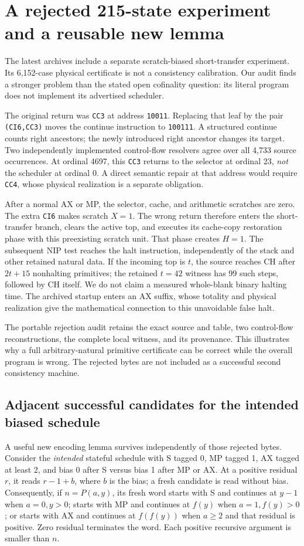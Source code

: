 \section{A rejected 215-state experiment and a reusable new lemma}
The latest archives include a separate scratch-biased short-transfer experiment. Its 6,152-case physical certificate is not a consistency calibration. Our audit finds a stronger problem than the stated open cofinality question: its literal program does not implement its advertised scheduler.

The original return was \texttt{CC3} at address \texttt{10011}. Replacing that leaf by the pair \texttt{(CI6,CC3)} moves the continue instruction to \texttt{100111}. A structured continue counts right ancestors; the newly introduced right ancestor changes its target. Two independently implemented control-flow resolvers agree over all 4,733 source occurrences. At ordinal 4697, this \texttt{CC3} returns to the selector at ordinal 23, \emph{not} the scheduler at ordinal 0. A direct semantic repair at that address would require \texttt{CC4}, whose physical realization is a separate obligation.

After a normal AX or MP, the selector, cache, and arithmetic scratches are zero. The extra \texttt{CI6} makes scratch $X=1$. The wrong return therefore enters the short-transfer branch, clears the active top, and executes its cache-copy restoration phase with this preexisting scratch unit. That phase creates $H=1$. The subsequent NIP test reaches the halt instruction, independently of the stack and other retained natural data. If the incoming top is $t$, the source reaches CH after $2t+15$ nonhalting primitives; the retained $t=42$ witness has 99 such steps, followed by CH itself. We do not claim a measured whole-blank binary halting time. The archived startup enters an AX suffix, whose totality and physical realization give the mathematical connection to this unavoidable false halt.

The portable rejection audit retains the exact source and table, two control-flow reconstructions, the complete local witness, and its provenance. This illustrates why a full arbitrary-natural primitive certificate can be correct while the overall program is wrong. The rejected bytes are not included as a successful second consistency machine.

\subsection{Adjacent successful candidates for the intended biased schedule}
A useful new encoding lemma survives independently of those rejected bytes. Consider the \emph{intended} stateful schedule with S tagged 0, MP tagged 1, AX tagged at least 2, and bias 0 after S versus bias 1 after MP or AX. At a positive residual $r$, it reads $r-1+b$, where $b$ is the bias; a fresh candidate is read without bias. Consequently, if $n=P(a,y)$, its fresh word starts with S and continues at $y-1$ when $a=0,y>0$; starts with MP and continues at $f(y)$ when $a=1,f(y)>0$; or starts with AX and continues at $f(f(y))$ when $a\ge2$ and that residual is positive. Zero residual terminates the word. Each positive recursive argument is smaller than $n$.

